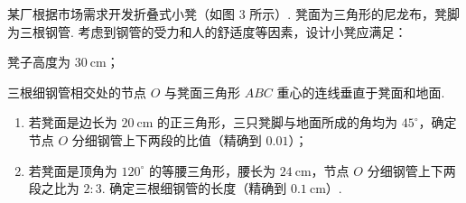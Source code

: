 \begin{problem}
某厂根据市场需求开发折叠式小凳（如图 \(3\) 所示）. 凳面为三角形的尼龙布，凳脚为三根钢管. 考虑到钢管的受力和人的舒适度等因素，设计小凳应满足：

\begin{circlelist}
\item 凳子高度为 \(30 \mathrm{~cm}\)；
\item 三根细钢管相交处的节点 \(O\) 与凳面三角形 \(ABC\) 重心的连线垂直于凳面和地面.
\end{circlelist}

\begin{enumerate}
\item 若凳面是边长为 \(20 \mathrm{~cm}\) 的正三角形，三只凳脚与地面所成的角均为 \(45^\circ\)，确定节点 \(O\) 分细钢管上下两段的比值（精确到 \(0.01\)）；
\item 若凳面是顶角为 \(120^\circ\) 的等腰三角形，腰长为 \(24 \mathrm{~cm}\)，节点 \(O\) 分细钢管上下两段之比为 \(2:3\). 确定三根细钢管的长度（精确到 \(0.1 \mathrm{~cm}\)）.
\end{enumerate}

\end{problem}

